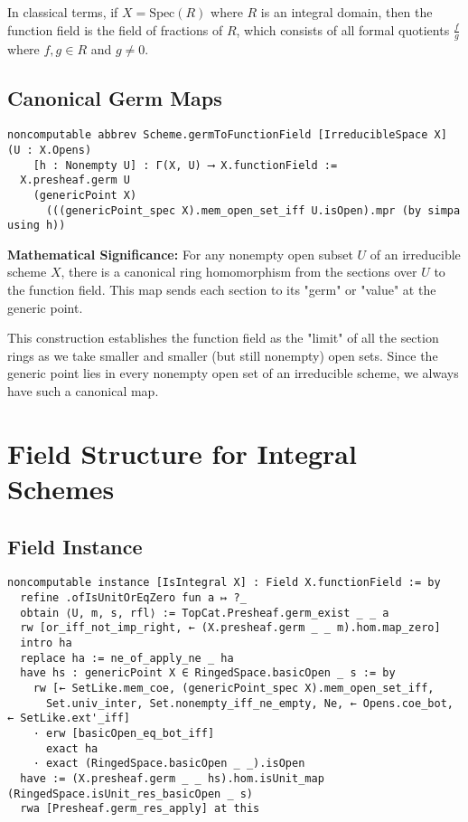 \documentclass{article}
\theoremstyle{definition}
\begin{document}
In classical terms, if $X = \mathrm{Spec}(R)$ where $R$ is an integral domain, then the function field is the field of fractions of $R$, which consists of all formal quotients $\frac{f}{g}$ where $f, g \in R$ and $g \neq 0$.

\subsection{Canonical Germ Maps}

\begin{lstlisting}
noncomputable abbrev Scheme.germToFunctionField [IrreducibleSpace X] (U : X.Opens)
    [h : Nonempty U] : Γ(X, U) ⟶ X.functionField :=
  X.presheaf.germ U
    (genericPoint X)
      (((genericPoint_spec X).mem_open_set_iff U.isOpen).mpr (by simpa using h))
\end{lstlisting}

\textbf{Mathematical Significance:} For any nonempty open subset $U$ of an irreducible scheme $X$, there is a canonical ring homomorphism from the sections over $U$ to the function field. This map sends each section to its "germ" or "value" at the generic point.

This construction establishes the function field as the "limit" of all the section rings as we take smaller and smaller (but still nonempty) open sets. Since the generic point lies in every nonempty open set of an irreducible scheme, we always have such a canonical map.

\section{Field Structure for Integral Schemes}

\subsection{Field Instance}

\begin{lstlisting}
noncomputable instance [IsIntegral X] : Field X.functionField := by
  refine .ofIsUnitOrEqZero fun a ↦ ?_
  obtain ⟨U, m, s, rfl⟩ := TopCat.Presheaf.germ_exist _ _ a
  rw [or_iff_not_imp_right, ← (X.presheaf.germ _ _ m).hom.map_zero]
  intro ha
  replace ha := ne_of_apply_ne _ ha
  have hs : genericPoint X ∈ RingedSpace.basicOpen _ s := by
    rw [← SetLike.mem_coe, (genericPoint_spec X).mem_open_set_iff,
      Set.univ_inter, Set.nonempty_iff_ne_empty, Ne, ← Opens.coe_bot, ← SetLike.ext'_iff]
    · erw [basicOpen_eq_bot_iff]
      exact ha
    · exact (RingedSpace.basicOpen _ _).isOpen
  have := (X.presheaf.germ _ _ hs).hom.isUnit_map (RingedSpace.isUnit_res_basicOpen _ s)
  rwa [Presheaf.germ_res_apply] at this
\end{lstlisting}
\end{document}
